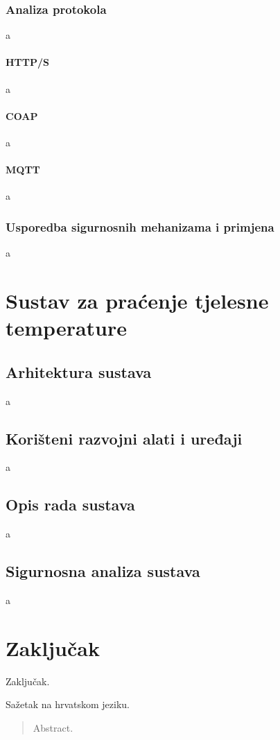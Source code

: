 \documentclass[times, utf8, diplomski]{fer}
\begin{document}
\subsection{Analiza protokola}
a

\subsubsection{HTTP/S}
a

\subsubsection{COAP}
a

\subsubsection{MQTT}
a

\subsection{Usporedba sigurnosnih mehanizama i primjena}
a

\chapter{Sustav za praćenje tjelesne temperature}

\section{Arhitektura sustava}
a

\section{Korišteni razvojni alati i uređaji}
a

\section{Opis rada sustava}
a

\section{Sigurnosna analiza sustava}
a


\chapter{Zaključak}
Zaključak.



\listoffigures
\listoftables

\begin{sazetak}
Sažetak na hrvatskom jeziku.

\end{sazetak}

\begin{abstract}
Abstract.

\end{abstract}
\end{document}
